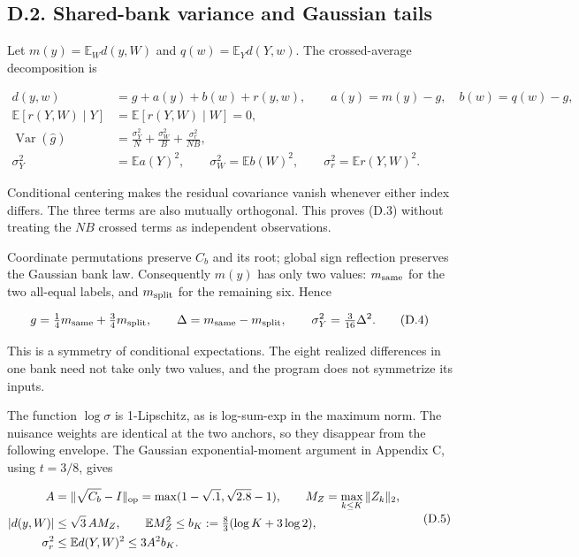 \documentclass{article}
\begin{document}
\subsection*{D.2. Shared-bank variance and Gaussian
tails}\label{d.2.-shared-bank-variance-and-gaussian-tails}

Let \(m(y)=\mathbb E_Wd(y,W)\) and \(q(w)=\mathbb E_Yd(Y,w)\). The
crossed-average decomposition is

\[
\begin{aligned}
d(y,w)&=g+a(y)+b(w)+r(y,w),\qquad
a(y)=m(y)-g,\quad b(w)=q(w)-g,\\
\mathbb E[r(Y,W)\mid Y]&=\mathbb E[r(Y,W)\mid W]=0,\\
\operatorname{Var}(\widehat g)
&=\frac{\sigma_Y^2}{N}+\frac{\sigma_W^2}{B}+\frac{\sigma_r^2}{NB},\\
\sigma_Y^2&=\mathbb E a(Y)^2,\qquad
\sigma_W^2=\mathbb E b(W)^2,\qquad
\sigma_r^2=\mathbb E r(Y,W)^2.
\end{aligned}
\tag{D.3}
\]

Conditional centering makes the residual covariance vanish whenever
either index differs. The three terms are also mutually orthogonal. This
proves (D.3) without treating the \(NB\) crossed terms as independent
observations.

Coordinate permutations preserve \(C_b\) and its root; global sign
reflection preserves the Gaussian bank law. Consequently \(m(y)\) has
only two values: \(m_{\rm same}\) for the two all-equal labels, and
\(m_{\rm split}\) for the remaining six. Hence

\[
g=\tfrac14m_{\rm same}+\tfrac34m_{\rm split},\qquad
\Delta=m_{\rm same}-m_{\rm split},\qquad
\sigma_Y^2=\tfrac3{16}\Delta^2.
\tag{D.4}
\]

This is a symmetry of conditional expectations. The eight realized
differences in one bank need not take only two values, and the program
does not symmetrize its inputs.

The function \(\log\sigma\) is 1-Lipschitz, as is log-sum-exp in the
maximum norm. The nuisance weights are identical at the two anchors, so
they disappear from the following envelope. The Gaussian
exponential-moment argument in Appendix C, using \(t=3/8\), gives

\[
\begin{aligned}
A&=\|\sqrt{C_b}-I\|_{\rm op}
=\max(1-\sqrt{.1},\sqrt{2.8}-1),\qquad
M_Z=\max_{k\le K}\|Z_k\|_2,\\
|d(y,W)|&\le\sqrt3\,A M_Z,\qquad
\mathbb E M_Z^2\le b_K:=\tfrac83(\log K+3\log2),\\
\sigma_r^2&\le\mathbb E d(Y,W)^2\le3A^2b_K.
\end{aligned}
\tag{D.5}
\]
\end{document}
